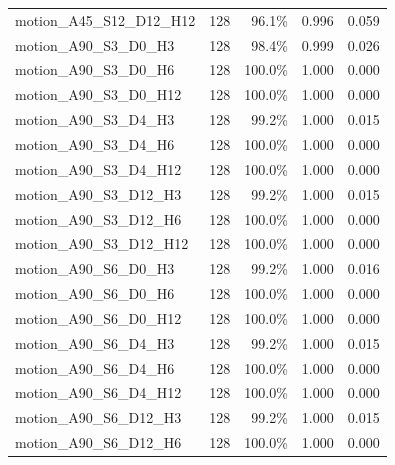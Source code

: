\documentclass[11pt]{article}
\begin{document}
\begin{longtable}{p{}rrrr}
motion\_\allowbreak{}A45\_\allowbreak{}S12\_\allowbreak{}D12\_\allowbreak{}H12 & 128 & 96.1\% & 0.996 & 0.059\\
motion\_\allowbreak{}A90\_\allowbreak{}S3\_\allowbreak{}D0\_\allowbreak{}H3 & 128 & 98.4\% & 0.999 & 0.026\\
motion\_\allowbreak{}A90\_\allowbreak{}S3\_\allowbreak{}D0\_\allowbreak{}H6 & 128 & 100.0\% & 1.000 & 0.000\\
motion\_\allowbreak{}A90\_\allowbreak{}S3\_\allowbreak{}D0\_\allowbreak{}H12 & 128 & 100.0\% & 1.000 & 0.000\\
motion\_\allowbreak{}A90\_\allowbreak{}S3\_\allowbreak{}D4\_\allowbreak{}H3 & 128 & 99.2\% & 1.000 & 0.015\\
motion\_\allowbreak{}A90\_\allowbreak{}S3\_\allowbreak{}D4\_\allowbreak{}H6 & 128 & 100.0\% & 1.000 & 0.000\\
motion\_\allowbreak{}A90\_\allowbreak{}S3\_\allowbreak{}D4\_\allowbreak{}H12 & 128 & 100.0\% & 1.000 & 0.000\\
motion\_\allowbreak{}A90\_\allowbreak{}S3\_\allowbreak{}D12\_\allowbreak{}H3 & 128 & 99.2\% & 1.000 & 0.015\\
motion\_\allowbreak{}A90\_\allowbreak{}S3\_\allowbreak{}D12\_\allowbreak{}H6 & 128 & 100.0\% & 1.000 & 0.000\\
motion\_\allowbreak{}A90\_\allowbreak{}S3\_\allowbreak{}D12\_\allowbreak{}H12 & 128 & 100.0\% & 1.000 & 0.000\\
motion\_\allowbreak{}A90\_\allowbreak{}S6\_\allowbreak{}D0\_\allowbreak{}H3 & 128 & 99.2\% & 1.000 & 0.016\\
motion\_\allowbreak{}A90\_\allowbreak{}S6\_\allowbreak{}D0\_\allowbreak{}H6 & 128 & 100.0\% & 1.000 & 0.000\\
motion\_\allowbreak{}A90\_\allowbreak{}S6\_\allowbreak{}D0\_\allowbreak{}H12 & 128 & 100.0\% & 1.000 & 0.000\\
motion\_\allowbreak{}A90\_\allowbreak{}S6\_\allowbreak{}D4\_\allowbreak{}H3 & 128 & 99.2\% & 1.000 & 0.015\\
motion\_\allowbreak{}A90\_\allowbreak{}S6\_\allowbreak{}D4\_\allowbreak{}H6 & 128 & 100.0\% & 1.000 & 0.000\\
motion\_\allowbreak{}A90\_\allowbreak{}S6\_\allowbreak{}D4\_\allowbreak{}H12 & 128 & 100.0\% & 1.000 & 0.000\\
motion\_\allowbreak{}A90\_\allowbreak{}S6\_\allowbreak{}D12\_\allowbreak{}H3 & 128 & 99.2\% & 1.000 & 0.015\\
motion\_\allowbreak{}A90\_\allowbreak{}S6\_\allowbreak{}D12\_\allowbreak{}H6 & 128 & 100.0\% & 1.000 & 0.000\\

\end{longtable}
\end{document}
